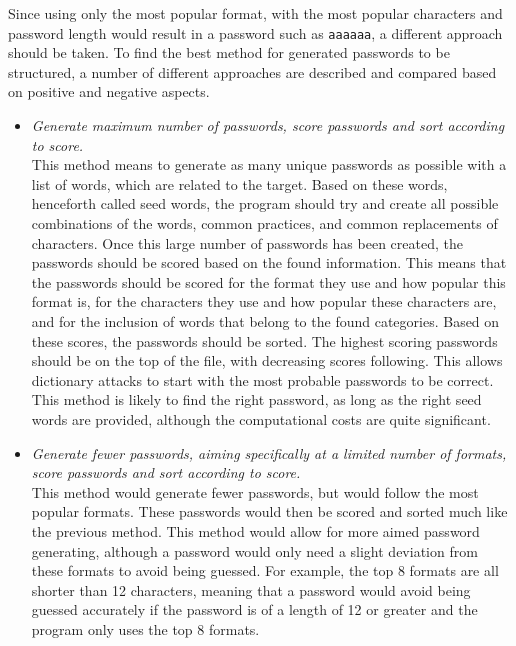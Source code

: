 \documentclass[a4paper,12pt]{article}
\begin{document}
Since using only the most popular format, with the most popular characters and password length would result in a password such as \lstinline{aaaaaa}, a different approach should be taken. To find the best method for generated passwords to be structured, a number of different approaches are described and compared based on positive and negative aspects.

\begin{itemize}
\item \textit{Generate maximum number of passwords, score passwords and sort according to score.}\\
  This method means to generate as many unique passwords as possible with a list of words, which are related to the target. Based on these words, henceforth called seed words, the program should try and create all possible combinations of the words, common practices, and common replacements of characters. Once this large number of passwords has been created, the passwords should be scored based on the found information. This means that the passwords should be scored for the format they use and how popular this format is, for the characters they use and how popular these characters are, and for the inclusion of words that belong to the found categories. Based on these scores, the passwords should be sorted. The highest scoring passwords should be on the top of the file, with decreasing scores following. This allows dictionary attacks to start with the most probable passwords to be correct. This method is likely to find the right password, as long as the right seed words are provided, although the computational costs are quite significant.\\
    
\item \textit{Generate fewer passwords, aiming specifically at a limited number of formats, score passwords and sort according to score.}\\
  This method would generate fewer passwords, but would follow the most popular formats. These passwords would then be scored and sorted much like the previous method. This method would allow for more aimed password generating, although a password would only need a slight deviation from these formats to avoid being guessed. For example, the top 8 formats are all shorter than 12 characters, meaning that a password would avoid being guessed accurately if the password is of a length of 12 or greater and the program only uses the top 8 formats.
\end{itemize}
\end{document}
